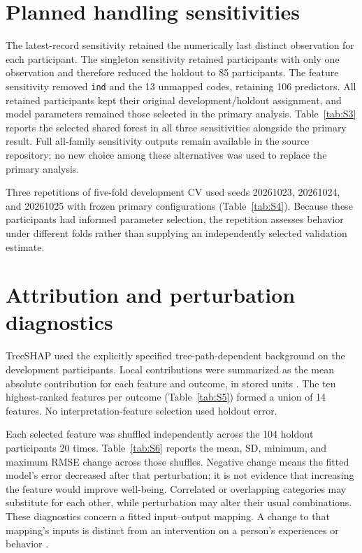 \section{Planned handling sensitivities}
The latest-record sensitivity retained the numerically last distinct observation for each participant. The singleton sensitivity retained participants with only one observation and therefore reduced the holdout to 85 participants. The feature sensitivity removed \texttt{ind} and the 13 unmapped codes, retaining 106 predictors. All retained participants kept their original development/holdout assignment, and model parameters remained those selected in the primary analysis. Table~\ref{tab:S3} reports the selected shared forest in all three sensitivities alongside the primary result. Full all-family sensitivity outputs remain available in the source repository; no new choice among these alternatives was used to replace the primary analysis.



Three repetitions of five-fold development CV used seeds 20261023, 20261024, and 20261025 with frozen primary configurations (Table~\ref{tab:S4}). Because these participants had informed parameter selection, the repetition assesses behavior under different folds rather than supplying an independently selected validation estimate.



\section{Attribution and perturbation diagnostics}
TreeSHAP used the explicitly specified tree-path-dependent background on the development participants. Local contributions were summarized as the mean absolute contribution for each feature and outcome, in stored units \citep{lundberg2020}. The ten highest-ranked features per outcome (Table~\ref{tab:S5}) formed a union of 14 features. No interpretation-feature selection used holdout error.



Each selected feature was shuffled independently across the 104 holdout participants 20 times. Table~\ref{tab:S6} reports the mean, SD, minimum, and maximum RMSE change across those shuffles. Negative change means the fitted model's error decreased after that perturbation; it is not evidence that increasing the feature would improve well-being. Correlated or overlapping categories may substitute for each other, while perturbation may alter their usual combinations. These diagnostics concern a fitted input--output mapping. A change to that mapping's inputs is distinct from an intervention on a person's experiences or behavior \citep{janzing2020}.

